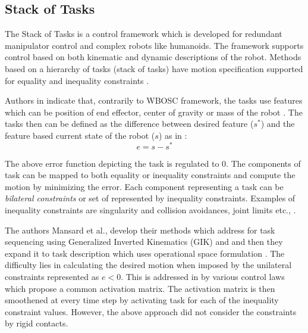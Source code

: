 \subsection{Stack of Tasks}
The Stack of Tasks is a control framework which is developed for redundant manipulator control and complex robots like humanoids. The framework supports control based on both kinematic and dynamic descriptions of the robot. Methods based on a hierarchy of tasks (stack of tasks) have motion specification supported for equality and inequality constraints \cite{mansard-icra-12}. 


Authors in \cite{mansard-icra-12} indicate that, contrarily to WBOSC framework, the tasks use features which can be position of end effector, center of gravity or mass of the robot \cite{stack}. The tasks then can be defined as the difference between desired feature ($s^*$) and the feature based current state of the robot ($s$) as in \cite{mansard-icra-12}: 
\begin{equation}
e = s - s^*
\label{error}
\end{equation}


The above error function depicting the task is regulated to $0$. The components of task can be mapped to both equality or inequality constraints and compute the motion by minimizing the error. Each component representing a task can be \textit{bilateral constraints} or set of represented by inequality constraints. Examples of inequality constraints are singularity and collision avoidances, joint limits etc., \cite{mansard2009unified}.  


The authors Mansard et al., develop their methods which address for task sequencing using Generalized Inverted Kinematics (GIK) \cite{mansard2009versatile} and and then they expand it to task description which uses operational space formulation \cite{escande2014hierarchical,saab2011generation,saab2011generic,mansard2012dedicated,saab2013dynamic}.
The difficulty lies in calculating the desired motion when imposed by the unilateral constraints represented as $e<0$. This is addressed in \cite{mansard2009unified} by various control laws which propose a common activation matrix. The activation matrix is then smoothened at every time step by activating task for each of the inequality constraint values. However, the above approach did not consider the constraints by rigid contacts.


